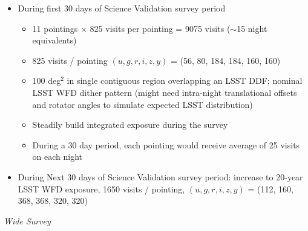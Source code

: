 \begin{itemize}

        \item During first 30 days of Science Validation survey period

        \begin{itemize}

                \item 11 pointings $\times$ 825 visits per pointing = 9075 visits ($\sim$15 night equivalents)
                \item 825 visits / pointing $(u, g, r, i, z, y)$ = (56, 80, 184, 184, 160, 160)
                \item 100 deg$^2$ in single contiguous region overlapping an LSST DDF; nominal LSST WFD dither pattern (might need intra-night translational offsets and rotator angles to simulate expected LSST distribution)
                \item Steadily build integrated exposure during the survey
                \item During a 30 day period, each pointing would receive average of 25 visits on each night

        \end{itemize}

        \item During Next 30 days of Science Validation survey period: increase to 20-year LSST WFD exposure, 1650 visits / pointing, $(u, g, r, i, z, y)$ = (112, 160, 368, 368, 320, 320)

\end{itemize}

\textit{Wide Survey}

